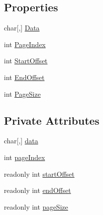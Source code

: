 \subsection*{Properties}
\begin{DoxyCompactItemize}
\item 
char\mbox{[},\mbox{]} \hyperlink{class_c_p_u___o_s___simulator_1_1_memory_1_1_memory_page___o_l_d_a203944883e8102c6aad517d1474bdc0b}{Data}
\item 
int \hyperlink{class_c_p_u___o_s___simulator_1_1_memory_1_1_memory_page___o_l_d_a92429e7bf791e6bc4d2c1ed54a999394}{Page\+Index}
\item 
int \hyperlink{class_c_p_u___o_s___simulator_1_1_memory_1_1_memory_page___o_l_d_aabc0df1123ef7c01b14a5b3a23615760}{Start\+Offset}
\item 
int \hyperlink{class_c_p_u___o_s___simulator_1_1_memory_1_1_memory_page___o_l_d_a1610e4a6a7f9d94412a831f269d0281d}{End\+Offset}
\item 
int \hyperlink{class_c_p_u___o_s___simulator_1_1_memory_1_1_memory_page___o_l_d_a058448789b0f5223ef410b223f2e9bb3}{Page\+Size}
\end{DoxyCompactItemize}
\subsection*{Private Attributes}
\begin{DoxyCompactItemize}
\item 
char\mbox{[},\mbox{]} \hyperlink{class_c_p_u___o_s___simulator_1_1_memory_1_1_memory_page___o_l_d_a0de587e2918454bff3fdb5cb30c67d49}{data}
\item 
int \hyperlink{class_c_p_u___o_s___simulator_1_1_memory_1_1_memory_page___o_l_d_a378522c3baf4d7cf4a7eaa8c164d3de8}{page\+Index}
\item 
readonly int \hyperlink{class_c_p_u___o_s___simulator_1_1_memory_1_1_memory_page___o_l_d_a9114e60bd23b6a77765e73520fb5ddc1}{start\+Offset}
\item 
readonly int \hyperlink{class_c_p_u___o_s___simulator_1_1_memory_1_1_memory_page___o_l_d_ad255a5229701ca9f7bb9c7fa90faf2ae}{end\+Offset}
\item 
readonly int \hyperlink{class_c_p_u___o_s___simulator_1_1_memory_1_1_memory_page___o_l_d_afb00546c1b356df209e380cf9b1b25d2}{page\+Size}
\end{DoxyCompactItemize}


